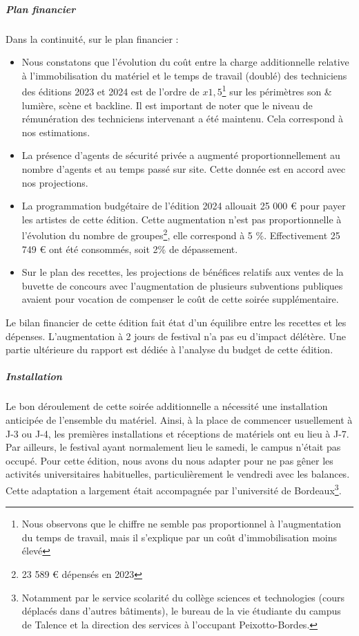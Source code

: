 \documentclass[12pt,a4paper]{report}
\begin{document}
\subparagraph{Plan financier}
Dans la continuité, sur le plan financier :
\begin{itemize}
\item Nous constatons que l'évolution du coût entre la charge additionnelle relative à l'immobilisation du matériel et le temps de travail (doublé) des techniciens des éditions 2023 et 2024 est de l'ordre de $x1,5$\footnote{Nous observons que le chiffre ne semble pas proportionnel à l'augmentation du temps de travail, mais il s'explique par un coût d'immobilisation moins élevé} sur les périmètres son \& lumière, scène et backline. Il est important de noter que le niveau de rémunération des techniciens intervenant a été maintenu. Cela correspond à nos estimations.
\item La présence d'agents de sécurité privée a augmenté proportionnellement au nombre d'agents et au temps passé sur site. Cette donnée est en accord avec nos projections.
\item La programmation budgétaire de l'édition 2024 allouait 25 000 € pour payer les artistes de cette édition. Cette augmentation n'est pas proportionnelle à l'évolution du nombre de groupes\footnote{23 589 € dépensés en 2023}, elle correspond à 5 \%. Effectivement 25 749 € ont été consommés, soit 2\% de dépassement.
\item Sur le plan des recettes, les projections de bénéfices relatifs aux ventes de la buvette de concours avec l'augmentation de plusieurs subventions publiques avaient pour vocation de compenser le coût de cette soirée supplémentaire.
\end{itemize}
Le bilan financier de cette édition fait état d'un équilibre entre les recettes et les dépenses. L'augmentation à 2 jours de festival n'a pas eu d'impact délétère. Une partie ultérieure du rapport est dédiée à l'analyse du budget de cette édition.

\subparagraph{Installation}
Le bon déroulement de cette soirée additionnelle a nécessité une installation anticipée de l'ensemble du matériel. Ainsi, à la place de commencer usuellement à J-3 ou J-4, les premières installations et réceptions de matériels ont eu lieu à J-7. Par ailleurs, le festival ayant normalement lieu le samedi, le campus n'était pas occupé. Pour cette édition, nous avons du nous adapter pour ne pas gêner les activités universitaires habituelles, particulièrement le vendredi avec les balances. Cette adaptation a largement était accompagnée par l'université de Bordeaux\footnote{Notamment par le service scolarité du collège sciences et technologies (cours déplacés dans d'autres bâtiments), le bureau de la vie étudiante du campus de Talence et la direction des services à l'occupant Peixotto-Bordes.}.
\end{document}

